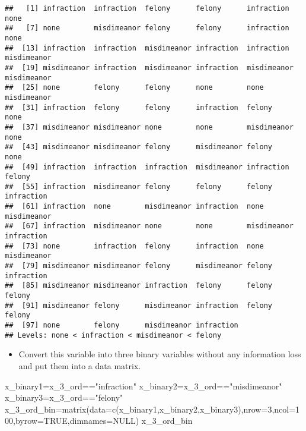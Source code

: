 \documentclass[
]{article}
\newenvironment{Shaded}{\begin{snugshade}}{\end{snugshade}}
\newcommand{\AttributeTok}[1]{\textcolor[rgb]{0.77,0.63,0.00}{#1}}
\newcommand{\ConstantTok}[1]{\textcolor[rgb]{0.00,0.00,0.00}{#1}}
\newcommand{\DecValTok}[1]{\textcolor[rgb]{0.00,0.00,0.81}{#1}}
\newcommand{\FunctionTok}[1]{\textcolor[rgb]{0.00,0.00,0.00}{#1}}
\newcommand{\NormalTok}[1]{#1}
\newcommand{\OtherTok}[1]{\textcolor[rgb]{0.56,0.35,0.01}{#1}}
\newcommand{\SpecialCharTok}[1]{\textcolor[rgb]{0.00,0.00,0.00}{#1}}
\newcommand{\StringTok}[1]{\textcolor[rgb]{0.31,0.60,0.02}{#1}}
\providecommand{\tightlist}{%
  \setlength{\itemsep}{0pt}\setlength{\parskip}{0pt}}
\begin{document}
\begin{verbatim}
##   [1] infraction  infraction  felony      felony      infraction  none       
##   [7] none        misdimeanor felony      felony      infraction  none       
##  [13] infraction  infraction  misdimeanor infraction  infraction  misdimeanor
##  [19] misdimeanor infraction  misdimeanor infraction  misdimeanor misdimeanor
##  [25] none        felony      felony      none        none        misdimeanor
##  [31] infraction  felony      felony      infraction  felony      none       
##  [37] misdimeanor misdimeanor none        none        misdimeanor none       
##  [43] misdimeanor misdimeanor felony      misdimeanor felony      none       
##  [49] infraction  infraction  infraction  misdimeanor infraction  felony     
##  [55] infraction  misdimeanor felony      felony      felony      infraction 
##  [61] infraction  none        misdimeanor infraction  none        misdimeanor
##  [67] infraction  misdimeanor none        none        misdimeanor infraction 
##  [73] none        infraction  felony      infraction  none        misdimeanor
##  [79] misdimeanor misdimeanor felony      misdimeanor felony      infraction 
##  [85] misdimeanor misdimeanor infraction  felony      felony      felony     
##  [91] misdimeanor felony      misdimeanor infraction  felony      felony     
##  [97] none        felony      misdimeanor infraction 
## Levels: none < infraction < misdimeanor < felony
\end{verbatim}

\begin{itemize}
\tightlist
\item
  Convert this variable into three binary variables without any
  information loss and put them into a data matrix.
\end{itemize}

\begin{Shaded}
\begin{Highlighting}[]
\NormalTok{x\_binary1}\OtherTok{=}\NormalTok{x\_3\_ord}\SpecialCharTok{==}\StringTok{"infraction"}
\NormalTok{x\_binary2}\OtherTok{=}\NormalTok{x\_3\_ord}\SpecialCharTok{==}\StringTok{"misdimeanor"}
\NormalTok{x\_binary3}\OtherTok{=}\NormalTok{x\_3\_ord}\SpecialCharTok{==}\StringTok{"felony"}
\NormalTok{x\_3\_ord\_bin}\OtherTok{=}\FunctionTok{matrix}\NormalTok{(}\AttributeTok{data=}\FunctionTok{c}\NormalTok{(x\_binary1,x\_binary2,x\_binary3),}\AttributeTok{nrow=}\DecValTok{3}\NormalTok{,}\AttributeTok{ncol=}\DecValTok{100}\NormalTok{,}\AttributeTok{byrow=}\ConstantTok{TRUE}\NormalTok{,}\AttributeTok{dimnames=}\ConstantTok{NULL}\NormalTok{)}
\NormalTok{x\_3\_ord\_bin}
\end{Highlighting}
\end{Shaded}
\end{document}
